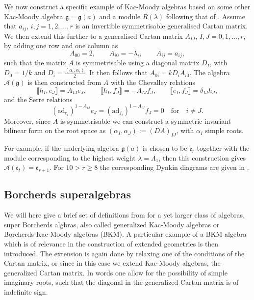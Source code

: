 We now construct a specific example of Kac-Moody algebras based on some other Kac-Moody algebra $\mathfrak{g}=\mathfrak{g}(a)$ and a module $R(\lambda)$ following that of \cite{CederwallPalmkvist2017}. Assume that $a_{ij}$, $i,j=1,2,\ldots,r$ is an invertible symmetrisable generalised Cartan matrix. We then extend this further to a generalised Cartan matrix $A_{IJ}$, $I,J=0,1,\ldots,r$, by adding one row and one column as 
\begin{equation}
    A_{00}=2,\qquad A_{i0} = -\lambda_i,\qquad A_{ij} = a_{ij},
\end{equation}
such that the matrix $A$ is symmetrisable using a diagonal matrix $D_I$, with $D_0=1/k$ and $D_i = \frac{(\alpha_i,\alpha_i)}{2}$. It then follows that $A_{0i}=kD_iA_{i0}$. The algebra $\mathscr{A}(\mathfrak{g})$ is then constructed from $A$ with the Chevalley relations 
\begin{equation}
    \llbracket h_I,e_J\rrbracket = A_{IJ}e_J,\qquad \llbracket h_I,f_J\rrbracket = -A_{IJ}f_J,\qquad \llbracket e_I,f_J\rrbracket = \delta_{IJ}h_J,
\end{equation}
and the Serre relations 
\begin{equation}\label{eq:SerreKacMoody}
    (\text{ad}_{e_i})^{1-A_{iJ}}e_J = (\text{ad}_{f_i})^{1-A_{iJ}}f_J = 0 \quad \text{for} \quad i\neq J.
\end{equation}
Moreover, since $A$ is symmetrisable we can construct a symmetric invariant bilinear form on the root space as $(\alpha_I,\alpha_J):=(DA)_{IJ}$, with $\alpha_I$ simple roots. 

For example, if the underlying algebra $\mathfrak{g}(a)$ is chosen to be $\mathfrak{e}_r$ together with the module corresponding to the highest weight $\lambda =\Lambda_1$, then this construction gives $\mathscr{A}(\mathfrak{e}_t)=\mathfrak{e}_{r+1}$. For $10>r\geq 8$ the corresponding Dynkin diagrams are given in . 

\subsection{Borcherds superalgebras}\label{sec:Borcherds}

We will here give a brief set of definitions from \cite{Ray2006} for a yet larger class of algebras, super Borcherds algbras, also called generalized Kac-Moody algebras or Borcherds-Kac-Moody algebras (BKM). A particular example of a BKM algebra which is of relevance in the construction of extended geometries is then introduced. The extension is again done by relaxing one of the conditions of the Cartan matrix, or since in this case we extend Kac-Moody algebras, the generalized Cartan matrix. In words one allow for the possibility of simple imaginary roots, such that the diagonal in the generalized Cartan matrix is of indefinite sign.

